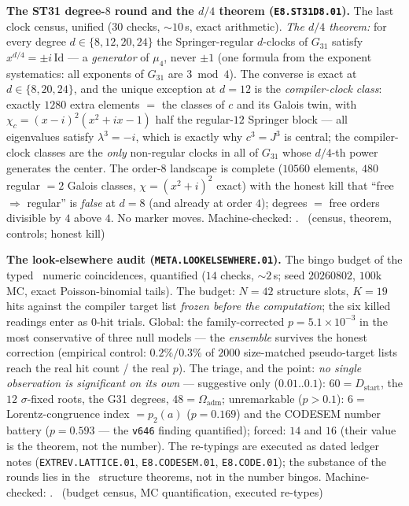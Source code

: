 \par\smallskip\noindent\textbf{The ST31 degree-$8$ round and the
$d/4$ theorem (\texttt{E8.ST31D8.01}).}
The last clock census, unified ($30$ checks, ${\sim}10$\,s, exact
arithmetic).  \emph{The $d/4$ theorem:} for every degree
$d\in\{8,12,20,24\}$ the Springer-regular $d$-clocks of $G_{31}$
satisfy $x^{d/4}=\pm i\,\mathrm{Id}$ --- a \emph{generator} of
$\mu_4$, never $\pm1$ (one formula from the exponent systematics:
all exponents of $G_{31}$ are $3\bmod4$).  The converse is exact at
$d\in\{8,20,24\}$, and the unique exception at $d=12$ is the
\emph{compiler-clock class}: exactly $1280$ extra elements $=$ the
classes of $c$ and its Galois twin, with
$\chi_c=(x-i)^2(x^2+ix-1)$ half the regular-$12$ Springer block ---
all eigenvalues satisfy $\lambda^3=-i$, which is exactly why
$c^3=J^3$ is central; the compiler-clock classes are the \emph{only}
non-regular clocks in all of $G_{31}$ whose $d/4$-th power generates
the center.  The order-$8$ landscape is complete ($10560$ elements,
$480$ regular $=2$ Galois classes, $\chi=(x^2+i)^2$ exact) with the
honest kill that ``free $\Rightarrow$ regular'' is \emph{false} at
$d=8$ (and already at order $4$); degrees $=$ free orders divisible
by $4$ above $4$.  No marker moves.
Machine-checked: .
\mE\ (census, theorem, controls; honest kill)
\par\smallskip

\par\smallskip\noindent\textbf{The look-elsewhere audit
(\texttt{META.LOOKELSEWHERE.01}).}
The bingo budget of the typed \mC\ numeric coincidences, quantified
($14$ checks, ${\sim}2$\,s; seed $20260802$, $100$k MC, exact
Poisson-binomial tails).  The budget: $N=42$ structure slots, $K=19$
hits against the compiler target list \emph{frozen before the
computation}; the six killed readings enter as $0$-hit trials.
Global: the family-corrected $p=5.1\times10^{-3}$ in the most
conservative of three null models --- the \emph{ensemble} survives
the honest correction (empirical control: $0.2\%/0.3\%$ of $2000$
size-matched pseudo-target lists reach the real hit count / the real
$p$).  The triage, and the point: \emph{no single observation is
significant on its own} --- suggestive only ($0.01..0.1$):
$60=D_{\mathrm{start}}$, the $12$ $\sigma$-fixed roots, the G31
degrees, $48=\Omega_{\mathrm{adm}}$; unremarkable ($p>0.1$): $6=$
Lorentz-congruence index $=p_2(a)$ ($p=0.169$) and the CODESEM
number battery ($p=0.593$ --- the \texttt{v646} finding quantified);
forced: $14$ and $16$ (their value is the theorem, not the number).
The re-typings are executed as dated ledger notes
(\texttt{EXTREV.LATTICE.01}, \texttt{E8.CODESEM.01},
\texttt{E8.CODE.01}); the substance of the rounds lies in the \mE\
structure theorems, not in the number bingos.
Machine-checked: .
\mE\ (budget census, MC quantification, executed re-types)
\par\smallskip

